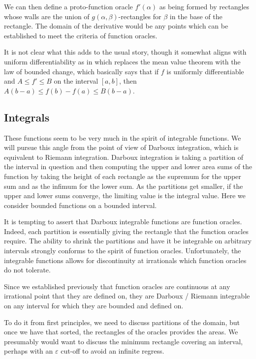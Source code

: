 \documentclass[12pt]{article}
\theoremstyle{remark}
\begin{document}
We can then define a proto-function oracle $f'(\alpha)$ as being formed by rectangles whose walls are the union of $g(\alpha, \beta)$-rectangles for $\beta$ in the base of the rectangle. The domain of the derivative would be any points which can be established to meet the criteria of function oracles. 

It is not clear what this adds to the usual story, though it somewhat aligns with uniform differentiability as in \cite{BriStol} which replaces the mean value theorem with the law of bounded change, which basically says that if $f$ is uniformly differentiable and $A \leq f' \leq B$ on the interval $[a,b]$, then $A(b-a) \leq f(b)-f(a) \leq B(b-a)$.  

\subsection{Integrals}\label{sec:int}

These functions seem to be very much in the spirit of integrable functions. We will pursue this angle from the point of view of Darboux integration, which is equivalent to Riemann integration. Darboux integration is taking a partition of the interval in question and then computing the upper and lower area sums of the function by taking the height of each rectangle as the supremum for the upper sum and as the infimum for the lower sum. As the partitions get smaller, if the upper and lower sums converge, the limiting value is the integral value. Here we consider bounded functions on a bounded interval. 

It is tempting to assert that Darboux integrable functions are function oracles. Indeed, each partition is essentially giving the rectangle that the function oracles require. The ability to shrink the partitions and have it be integrable on arbitrary intervals strongly conforms to the spirit of function oracles. Unfortunately, the integrable functions allows for discontinuity at irrationals which function oracles do not tolerate. 

Since we established previously that function oracles are continuous at any irrational point that they are defined on, they are Darboux / Riemann integrable on any interval for which they are bounded and defined on. 

To do it from first principles, we need to discuss partitions of the domain, but once we have that sorted, the rectangles of the oracles provides the areas. We presumably would want to discuss the minimum rectangle covering an interval, perhaps with an $\varepsilon$ cut-off to avoid an infinite regress. 
\end{document}

